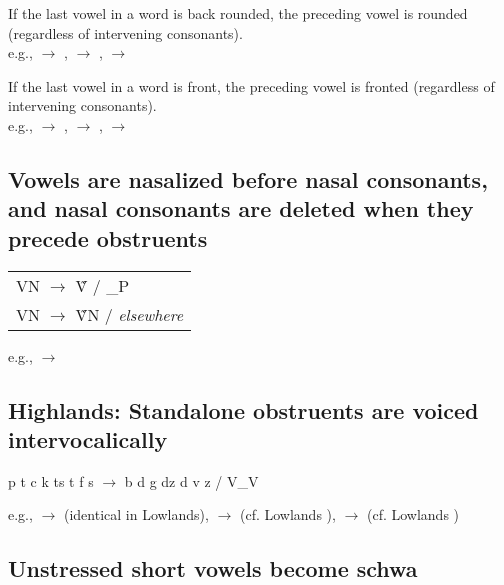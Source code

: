 If the last vowel in a word is back rounded, the preceding vowel is rounded (regardless of intervening consonants).\\
e.g.,   $\to$ ,   $\to$ ,   $\to$ 

If the last vowel in a word is front, the preceding vowel is fronted (regardless of intervening consonants).\\
e.g.,   $\to$ ,   $\to$ ,   $\to$ 

\subsection{Vowels are nasalized before nasal consonants, and nasal consonants are deleted when they precede obstruents}

\begin{center}
    \begin{tabular}{l}
        VN $\to$ \~{V} / \_P \\
        VN $\to$ \~{V}N / \emph{elsewhere}
    \end{tabular}
\end{center}

e.g.,   $\to$ 

\subsection{{\sc Highlands:} Standalone obstruents are voiced intervocalically}

\begin{center}
    p t c k t\tiebar s t\tiebar\esh{} f s \esh{} $\to$ b d \paljstop{} g d\tiebar z d\tiebar\ezh{} v z \ezh{} / V\_V
\end{center}

e.g.,   $\to$  (identical in Lowlands),   $\to$  (cf. Lowlands ),   $\to$  (cf. Lowlands )

\subsection{Unstressed short vowels become schwa}

